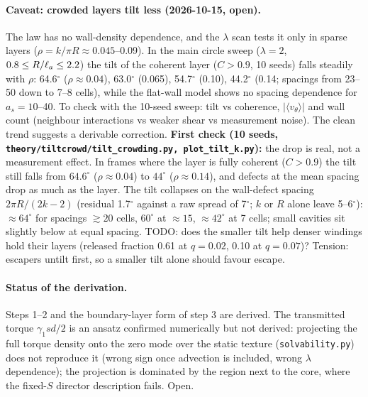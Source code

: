 \paragraph{Caveat: crowded layers tilt less (2026-10-15, open).} The law has no wall-density dependence, and the $\lambda$ scan tests it only in sparse layers
($\rho=k/\pi R\approx0.045$--0.09). In the main circle sweep ($\lambda=2$, $0.8\le R/\ell_a\le2.2$) the tilt of the coherent layer ($C>0.9$, 10 seeds) falls steadily with $\rho$: 64.6$^\circ$
($\rho\approx0.04$), 63.0$^\circ$ (0.065), 54.7$^\circ$ (0.10), 44.2$^\circ$ (0.14; spacings from 23--50 down to 7--8 cells), while the flat-wall model shows no spacing
dependence for $a_s=10$--40. To check with the 10-seed sweep: tilt vs coherence, $|\langle v_\theta\rangle|$ and wall count (neighbour interactions vs weaker shear vs
measurement noise). The clean trend suggests a derivable correction. \textbf{First check (10 seeds, \texttt{theory/tiltcrowd/tilt\_crowding.py, plot\_tilt\_k.py}):} the drop is real, not a measurement effect. In frames where the layer is fully coherent
($C>0.9$) the tilt still falls from $64.6^\circ$ ($\rho\approx0.04$) to $44^\circ$ ($\rho\approx0.14$), and defects at the mean spacing drop as much as the layer.
The tilt collapses on the wall-defect spacing $2\pi R/(2k-2)$ (residual 1.7$^\circ$ against a raw spread of 7$^\circ$; $k$ or $R$ alone leave 5--6$^\circ$):
$\approx64^\circ$ for spacings $\gtrsim20$ cells, $60^\circ$ at $\approx15$, $\approx42^\circ$ at 7 cells; small cavities sit slightly below at equal spacing. TODO: does the smaller tilt help denser windings hold their layers (released fraction 0.61 at
$q=0.02$, 0.10 at $q=0.07$)? Tension: escapers untilt first, so a smaller tilt alone should favour escape.

\paragraph{Status of the derivation.} Steps 1--2 and the boundary-layer form of step 3 are derived. The transmitted torque $\gamma_1sd/2$ is an ansatz confirmed numerically
but not derived: projecting the full torque density onto the zero mode over the static texture (\texttt{solvability.py}) does not reproduce it (wrong sign once advection is
included, wrong $\lambda$ dependence); the projection is dominated by the region next to the core, where the fixed-$S$ director description fails. Open.
